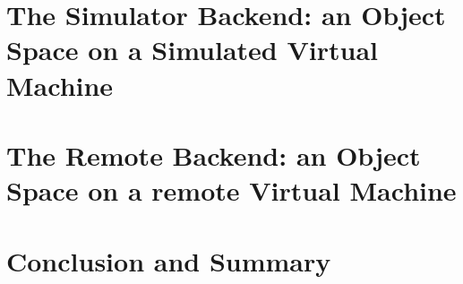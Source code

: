 \section{The Simulator Backend: an Object Space on a Simulated Virtual Machine}

\section{The Remote Backend: an Object Space on a remote Virtual Machine}

\section{Conclusion and Summary}

